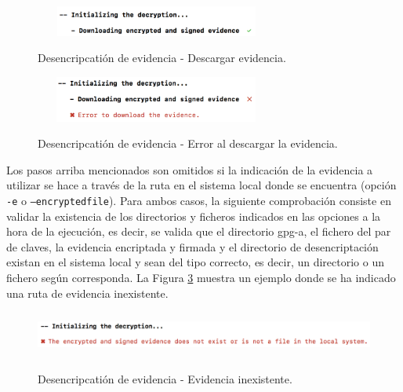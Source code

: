\documentclass[12pt,a4paper, twoside]{report}
\begin{document}
\begin{itemize}
			\begin{figure}[!ht]   
				\caption{Desencripcatión de evidencia - Descargar evidencia.} 
				\begin{center} 
					\includegraphics[width=8cm,height=1cm]{Images/userGuide/evidence/download} \\
					\label{fig:userguide_evidence_download} 
				\end{center}  
			\end{figure}
			
			\begin{figure}[!ht]   
				\caption{Desencripcatión de evidencia - Error al descargar la evidencia.} 
				\begin{center} 
					\includegraphics[width=8cm,height=1.5cm]{Images/userGuide/evidence/error_download} \\
					\label{fig:userguide_evidence_error_download} 
				\end{center}  
			\end{figure}
			
	\end{itemize}
	
	Los pasos arriba mencionados son omitidos si la indicación de la evidencia a utilizar se hace a través de la ruta en el sistema local donde se encuentra (opción \texttt{-e} o \texttt{--encryptedfile}). Para ambos casos, la siguiente comprobación consiste en validar la existencia de los directorios y ficheros indicados en las opciones a la hora de la ejecución, es decir, se valida que el directorio \gls{gpg-a}, el fichero del par de claves, la evidencia encriptada y firmada y el directorio de desencriptación existan en el sistema local y sean del tipo correcto, es decir, un directorio o un fichero según corresponda. La Figura \ref{fig:userguide_evidence_nonexist} muestra un ejemplo donde se ha indicado una ruta de evidencia inexistente.
	
	\newpage
	
		\begin{figure}[!ht]   
			\caption{Desencripcatión de evidencia - Evidencia inexistente.} 
			\begin{center} 					\includegraphics[width=15cm,height=1.5cm]{Images/userGuide/evidence/evidence_nonexist} \\
				\label{fig:userguide_evidence_nonexist} 
			\end{center}  
		\end{figure}
\end{document}
